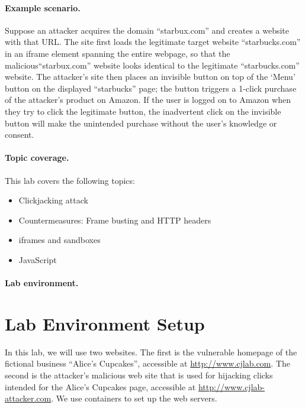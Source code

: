 \paragraph{Example scenario.} Suppose an attacker acquires the domain
``starbux.com'' and creates a website with that URL. The site first
loads the legitimate target website ``starbucks.com'' in an iframe
element spanning the entire webpage, so that the
malicious``starbux.com'' website looks identical to the legitimate
``starbucks.com'' website.  The attacker's site then places an invisible
button on top of the `Menu' button on the displayed ``starbucks'' page;
the button triggers a 1-click purchase of the attacker's product on
Amazon.  If the user is logged on to Amazon when they try to click the
legitimate button, the inadvertent click on the invisible button will
make the unintended purchase without the user's knowledge or consent.

\paragraph{Topic coverage.} This lab covers the following topics:
\begin{itemize}[noitemsep]
 \item Clickjacking attack
 \item Countermeasures: Frame busting and HTTP headers
 \item iframes and sandboxes
 \item JavaScript
\end{itemize}

\paragraph{Lab environment.}
\seedenvironmentB
\nodependency



\section{Lab Environment Setup}

In this lab, we will use two websites.  The first is the vulnerable
homepage of the fictional business ``Alice's Cupcakes'', accessible at
\url{http://www.cjlab.com}.  The second is the attacker's malicious web site
that is used for hijacking clicks intended for the Alice's Cupcakes
page, accessible at \url{http://www.cjlab-attacker.com}. We
use containers to set up the web servers.
 
